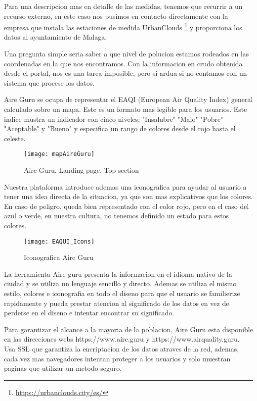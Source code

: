 Para una descripcion mas en detalle de las medidas, tenemos que recurrir a un recurso externo, en este caso nos pusimos en contacto directamente con
la empresa que instala las estaciones de medida UrbanClouds \footnote{\url{https://urbanclouds.city/es/}} y proporciona los datos al ayuntamiento de Malaga.

Una pregunta simple seria saber a que nivel de polucion estamos rodeados en las coordenadas en la que nos encontramos. Con la informacion en 
crudo obtenida desde el portal, nos es una tarea imposible, pero si ardua si no contamos con un sistema que procese los datos.

Aire Guru se ocupa de representar el EAQI (European Air Quality Index) general calculado sobre un mapa. Este es un formato mas legible para los usuarios.
Este indice mustra un indicador con cinco niveles: "Insalubre" "Malo" "Pobre" "Aceptable" y "Bueno" y especifica un rango de colores desde el rojo hasta el celeste.

\begin{figure}[ht]
    \centering
    \texttt{[image: mapAireGuru]}
    \caption{Aire Guru. Landing page. Top section}
\end{figure}
Nuestra plataforma introduce ademas una iconografica para ayudar al usuario a tener una idea directa de la situacion, ya que son mas 
explicativos que los colores. En caso de peligro, queda bien representado con el color rojo, pero en el caso del azul o verde, en nuestra cultura, no
tenemos definido un estado para estos colores.
\begin{figure}[ht]
    \centering
    \texttt{[image: EAQUI\_Icons]}
    \caption{Iconografica Aire Guru}
\end{figure}
\newpage

La herramienta Aire guru presenta la informacion en el idioma nativo de la ciudad y se utiliza un lenguaje sencillo y directo.
Ademas se utiliza el mismo estilo, colores e iconografia en todo el diseno para que el usuario se familierize rapidamente y pueda
prestar atencion al significado de los datos en vez de perderse en el diseno e intentar encontrar su significado.

Para garantizar el alcance a la mayoria de la poblacion, Aire Guru esta disponible en las direcciones webs https://www.aire.guru y https://www.airquality.guru.
Usa SSL que garantiza la encriptacion de los datos atraves de la red, ademas, cada vez mas navegadores intentan proteger a los usuarios y
solo muestran paginas que utilizar un metodo seguro. 

